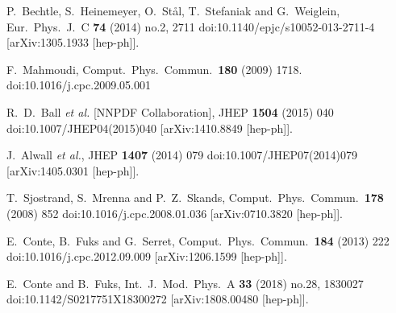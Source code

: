 \documentclass[12pt]{article}
\begin{document}
\begin{thebibliography}{99}
  P.~Bechtle, S.~Heinemeyer, O.~Stål, T.~Stefaniak and G.~Weiglein,
  Eur.\ Phys.\ J.\ C {\bf 74} (2014) no.2,  2711
  doi:10.1140/epjc/s10052-013-2711-4
  [arXiv:1305.1933 [hep-ph]].


  F.~Mahmoudi,
  Comput.\ Phys.\ Commun.\  {\bf 180} (2009) 1718.
  doi:10.1016/j.cpc.2009.05.001


  R.~D.~Ball {\it et al.} [NNPDF Collaboration],
  JHEP {\bf 1504} (2015) 040
  doi:10.1007/JHEP04(2015)040
  [arXiv:1410.8849 [hep-ph]].


  J.~Alwall {\it et al.},
  JHEP {\bf 1407} (2014) 079
  doi:10.1007/JHEP07(2014)079
  [arXiv:1405.0301 [hep-ph]].


  T.~Sjostrand, S.~Mrenna and P.~Z.~Skands,
  Comput.\ Phys.\ Commun.\  {\bf 178} (2008) 852
  doi:10.1016/j.cpc.2008.01.036
  [arXiv:0710.3820 [hep-ph]].


  E.~Conte, B.~Fuks and G.~Serret,
  Comput.\ Phys.\ Commun.\  {\bf 184} (2013) 222
  doi:10.1016/j.cpc.2012.09.009
  [arXiv:1206.1599 [hep-ph]].


  E.~Conte and B.~Fuks,
  Int.\ J.\ Mod.\ Phys.\ A {\bf 33} (2018) no.28,  1830027
  doi:10.1142/S0217751X18300272
  [arXiv:1808.00480 [hep-ph]].



\end{thebibliography}
\end{document}
